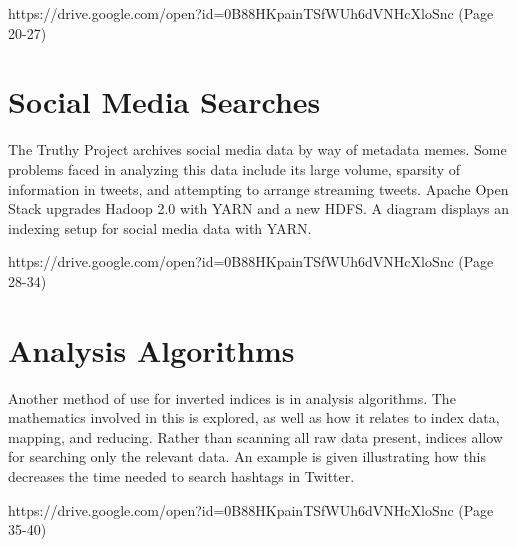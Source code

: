 
{https://drive.google.com/open?id=0B88HKpainTSfWUh6dVNHcXloSnc
  (Page 20-27)}

\section{Social Media Searches}

The Truthy Project archives social media data by way of metadata memes.
Some problems faced in analyzing this data include its large volume,
sparsity of information in tweets, and attempting to arrange streaming
tweets. Apache Open Stack upgrades Hadoop 2.0 with YARN and a new HDFS.
A diagram displays an indexing setup for social media data with YARN.


{https://drive.google.com/open?id=0B88HKpainTSfWUh6dVNHcXloSnc
  (Page 28-34)}

\section{Analysis Algorithms}

Another method of use for inverted indices is in analysis algorithms.
The mathematics involved in this is explored, as well as how it relates
to index data, mapping, and reducing. Rather than scanning all raw data
present, indices allow for searching only the relevant data. An example
is given illustrating how this decreases the time needed to search
hashtags in Twitter.


{https://drive.google.com/open?id=0B88HKpainTSfWUh6dVNHcXloSnc
  (Page 35-40)}

